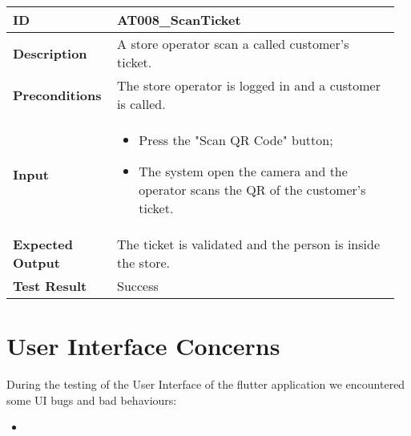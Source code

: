 \begin{table}[H]
	\centering
	\begin{tabular}{@{}p{0.25\linewidth}p{0.71\linewidth}@{}}
		\toprule
		\textbf{ID} & AT008\_ScanTicket \\
		\midrule
		\textbf{Description} & A store operator scan a called customer's ticket. \\
		\midrule
		\textbf{Preconditions} & The store operator is logged in and a customer is called.\\
		\midrule
		\textbf{Input} & \begin{itemize}[leftmargin=.4cm,noitemsep,topsep=0pt,before=\vspace{-3mm},after=\vspace{-4mm}]
			\item Press the "Scan QR Code" button;
			\item The system open the camera and the operator scans the QR of the customer's ticket.
		\end{itemize}\\
		\midrule
		\textbf{Expected Output} & The ticket is validated and the person is inside the store.\\
		\midrule
		\textbf{Test Result} & Success\\
		\bottomrule
	\end{tabular}
\end{table}


\clearpage

\section{User Interface Concerns}
During the testing of the User Interface of the flutter application we encountered some UI bugs and bad behaviours:
\begin{itemize}
	\item 
\end{itemize}
